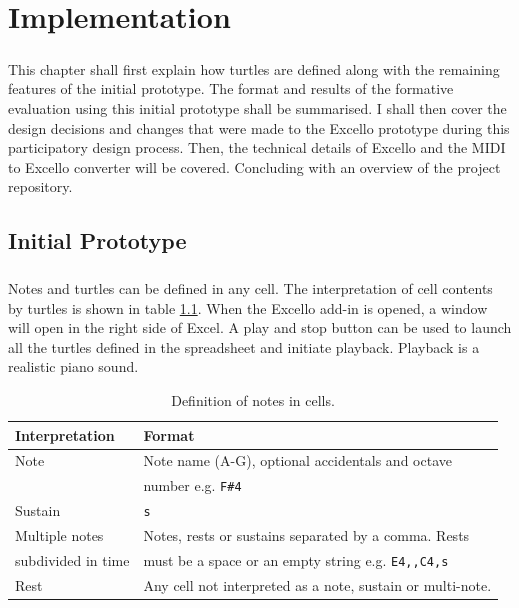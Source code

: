 \chapter{Implementation}

\paragraph{} This chapter shall first explain how turtles are defined along with the remaining features of the initial prototype. The format and results of the formative evaluation using this initial prototype shall be summarised. I shall then cover the design decisions and changes that were made to the Excello prototype during this participatory design process. Then, the technical details of Excello and the MIDI to Excello converter will be covered. Concluding with an overview of the project repository.

\section{Initial Prototype}

\paragraph{} Notes and turtles can be defined in any cell. The interpretation of cell contents by turtles is shown in table \ref{tab:cells}. When the Excello add-in is opened, a window will open in the right side of Excel. A play and stop button can be used to launch all the turtles defined in the spreadsheet and initiate playback. Playback is a realistic piano sound.

\begin{table}
\centering
\caption{Definition of notes in cells.}
\vspace{1pt}
\begin{tabular}{|l|l|} \hline
\textbf{Interpretation}&\textbf{Format}\\ \hline
Note& Note name (A-G), optional accidentals and octave \\
&number e.g. \texttt{F\#4}\\ \hline
Sustain& \texttt{s}\\ \hline
Multiple notes& Notes, rests or sustains separated by a comma. Rests \\
subdivided in time& must be a space or an empty string e.g. \texttt{E4,,C4,s}\\ \hline
Rest& Any cell not interpreted as a note, sustain or multi-note. \\ \hline
\end{tabular}
\label{tab:cells}
\end{table}

